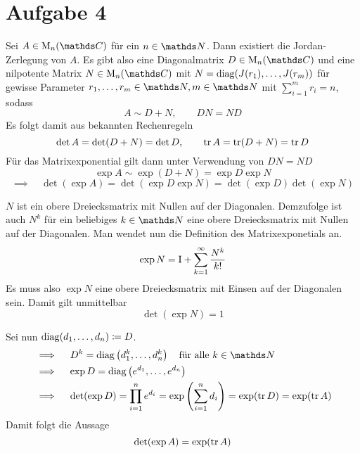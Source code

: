 
	\section*{Aufgabe 4} %
	\label{sec:aufgabe_4}
	
		Sei $A\in\m{M}_n(\SC)$ für ein $n\in\SN$.
		Dann existiert die Jordan-Zerlegung von $A$.
		Es gibt also eine Diagonalmatrix $D\in\m{M}_n(\SC)$ und eine nilpotente Matrix $N\in\m{M}_n(\SC)$ mit $N=\operatorname{diag}(J(r_1),\ldots,J(r_m))$ für gewisse Parameter $r_1,\ldots,r_m\in\SN,m\in\SN$ mit $\sum_{i=1}^{m}r_i = n$, sodass
		\[ A\sim D + N,\qquad DN=ND \]
		Es folgt damit aus bekannten Rechenregeln
		\[ \det A = \det(D+N) = \det D,\qquad \operatorname{tr} A = \operatorname{tr}(D+N) = \operatorname{tr} D \]
		Für das Matrixexponential gilt dann unter Verwendung von $DN=ND$
		\[ \exp A \sim \exp(D+N) = \exp D \exp N \]
		\[ \implies \quad \det(\exp A) = \det(\exp D \exp N) = \det(\exp D)\det(\exp N) \]

		$N$ ist ein obere Dreiecksmatrix mit Nullen auf der Diagonalen.
		Demzufolge ist auch $N^k$ für ein beliebiges $k\in\SN$ eine obere Dreiecksmatrix mit Nullen auf der Diagonalen.
		Man wendet nun die Definition des Matrixexponetials an.
		\[ \exp N = \mathrm{I} + \sum_{k=1}^\infty \frac{N^k}{k!} \]
		Es muss also $\exp N$ eine obere Dreiecksmatrix mit Einsen auf der Diagonalen sein.
		Damit gilt unmittelbar
		\[ \det (\exp N) = 1 \]

		Sei nun $\operatorname{diag}(d_1,\ldots,d_n)\coloneqq D$.
		\begin{alignat*}{3}
			&\implies \quad D^k = \diag\curvb{d_1^k,\ldots,d_n^k} \quad \text{für alle } k\in\SN \\
			&\implies \quad \exp D = \diag\curvb{e^{d_1},\ldots,e^{d_n}} \\
			&\implies \quad \det(\exp D) = \prod_{i=1}^n e^{d_i} = \exp\curvb{\sum_{i=1}^n d_i} = \exp(\tr D) = \exp(\tr A)
		\end{alignat*}
		Damit folgt die Aussage
		\[ \det(\exp A) = \exp(\operatorname{tr} A) \]
		\qedbox


